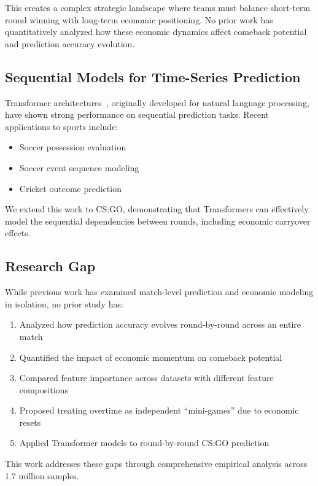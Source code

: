 \documentclass[11pt]{article}
\begin{document}
This creates a complex strategic landscape where teams must balance short-term round winning with long-term economic positioning. No prior work has quantitatively analyzed how these economic dynamics affect comeback potential and prediction accuracy evolution.

\subsection{Sequential Models for Time-Series Prediction}

Transformer architectures~\cite{vaswani2017}, originally developed for natural language processing, have shown strong performance on sequential prediction tasks. Recent applications to sports include:
\begin{itemize}
    \item Soccer possession evaluation~\cite{fernandez2021}
    \item Soccer event sequence modeling~\cite{decroos2019}
    \item Cricket outcome prediction~\cite{pathak2016}
\end{itemize}

We extend this work to CS:GO, demonstrating that Transformers can effectively model the sequential dependencies between rounds, including economic carryover effects.

\subsection{Research Gap}

While previous work has examined match-level prediction and economic modeling in isolation, no prior study has:
\begin{enumerate}
    \item Analyzed how prediction accuracy evolves round-by-round across an entire match
    \item Quantified the impact of economic momentum on comeback potential
    \item Compared feature importance across datasets with different feature compositions
    \item Proposed treating overtime as independent ``mini-games'' due to economic resets
    \item Applied Transformer models to round-by-round CS:GO prediction
\end{enumerate}

This work addresses these gaps through comprehensive empirical analysis across 1.7 million samples.
\end{document}
